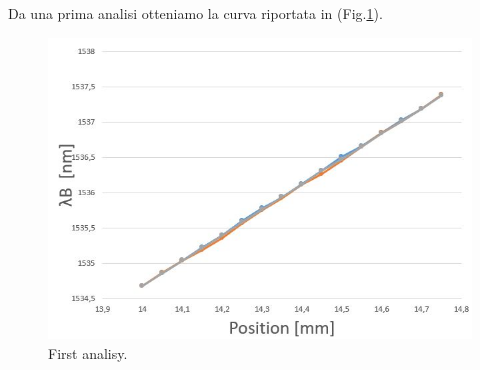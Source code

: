 Da una prima analisi otteniamo la curva riportata in (Fig.\ref{fig:firstAnalisy}).
\begin{figure}[h]
    \centering
    \includegraphics[scale=0.7]{img/firstAnalisy.jpg}
    \caption{First analisy.}
    \label{fig:firstAnalisy}
\end{figure}


